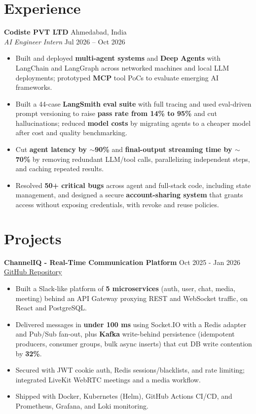 \documentclass[a4paper,10pt]{article}
\begin{document}
\section{Experience}
\textbf{Codiste PVT LTD} \hfill Ahmedabad, India\\
\textit{AI Engineer Intern} \hfill Jul 2026 -- Oct 2026
\begin{itemize}[itemsep=0pt, topsep=0pt]
  \item Built and deployed \textbf{multi-agent systems} and \textbf{Deep Agents} with LangChain and LangGraph across networked machines and local LLM deployments; prototyped \textbf{MCP} tool PoCs to evaluate emerging AI frameworks.
  \item Built a 44-case \textbf{LangSmith eval suite} with full tracing and used eval-driven prompt versioning to raise \textbf{pass rate from 14\% to 95\%} and cut hallucinations; reduced \textbf{model costs} by migrating agents to a cheaper model after cost and quality benchmarking.
  \item Cut \textbf{agent latency by $\sim$90\%} and \textbf{final-output streaming time by $\sim$70\%} by removing redundant LLM/tool calls, parallelizing independent steps, and caching repeated results.
  \item Resolved \textbf{50+ critical bugs} across agent and full-stack code, including state management, and designed a secure \textbf{account-sharing system} that grants access without exposing credentials, with revoke and reuse policies.
\end{itemize}

\section{Projects}

\textbf{ChannelIQ - Real-Time Communication Platform} \hfill Oct 2025 - Jan 2026\\[1pt]
\href{https://github.com/CodeSahil21/ChannelIQ}{GitHub Repository}
\begin{itemize}
\item Built a Slack-like platform of \textbf{5 microservices} (auth, user, chat, media, meeting) behind an API Gateway proxying REST and WebSocket traffic, on React and PostgreSQL.
\item Delivered messages in \textbf{under 100 ms} using Socket.IO with a Redis adapter and Pub/Sub fan-out, plus \textbf{Kafka} write-behind persistence (idempotent producers, consumer groups, bulk async inserts) that cut DB write contention by \textbf{32\%}.
\item Secured with JWT cookie auth, Redis sessions/blacklists, and rate limiting; integrated LiveKit WebRTC meetings and a media workflow.
\item Shipped with Docker, Kubernetes (Helm), GitHub Actions CI/CD, and Prometheus, Grafana, and Loki monitoring.
\end{itemize}
\end{document}
